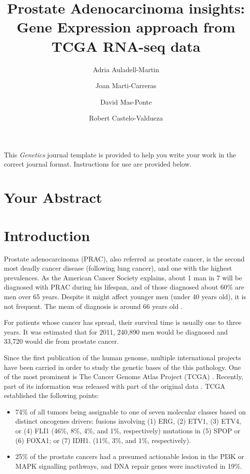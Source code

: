 \documentclass[9pt,twocolumn,twoside]{gsajnl}
\title{Prostate Adenocarcinoma insights: Gene Expression approach from TCGA RNA-seq data}
\author[$\ast$,$\dagger$]{Adria Auladell-Martin}
\author[$\ast$,$\dagger$]{Joan Marti-Carreras}
\author[$\ast$,$\dagger$]{David Mas-Ponte}
\author[$\ast$,1]{Robert Castelo-Valdueza}
\affil[$\ast$]{M.Sc. in Bioinformatics at Department of Experimental and Health Sciences (CEXS), Universitat Pompeu Fabra}
\affil[$\dagger$]{Authors Contributed Equally to this work}
\begin{document}
\maketitle
\thispagestyle{firststyle}
\marginmark
\firstpagefootnote
{}
\vspace{-11pt}%

\lettrine[lines=2]{\color{color2}T}{}his \textit{Genetics} journal template is provided to help you write your work in the correct journal format. Instructions for use are provided below.

\section*{Your Abstract}

\section*{Introduction}

Prostate adenocarcinoma (PRAC), also referred as prostate cancer, is  the second most deadly cancer disease (following lung cancer), and one with the highest prevalences. As the American Cancer Society explains, about 1 man in 7 will be diagnosed with PRAC during his lifespan, and of those diagnosed about 60\% are men over 65 years. Despite it might affect younger men (under 40 years old), it is not frequent. The mean of diagnosis is around 66 years old \cite{prostatestatistics}.

For patients whose cancer has spread, their survival time is usually one to three years. It was estimated that for 2011, 240,890 men would be diagnosed and 33,720 would die from prostate cancer.


Since the first publication of the human genome, multiple international projects have been carried in order to study the genetic bases of the this pathology. One of the most prominent is The Cancer Genome Atlas Project (TCGA) \cite{tgca}. Recently, part of its information was released with part of the original data \cite{Rahman15112015}. TCGA established the following points:

\begin{itemize}
\item 74\% of all tumors being assignable to one of seven molecular classes based on distinct oncogenes drivers:
        fusions involving (1) ERG, (2) ETV1, (3) ETV4, or (4) FLI1 (46\%, 8\%, 4\%, and 1\%, respectively)
        mutations in (5) SPOP or (6) FOXA1; or (7) IDH1. (11\%, 3\%, and 1\%, respectively).
\item 25\% of the prostate cancers had a presumed actionable lesion in the PI3K or MAPK signalling pathways, and DNA repair genes were inactivated in 19\%.
\end{itemize}
\end{document}
